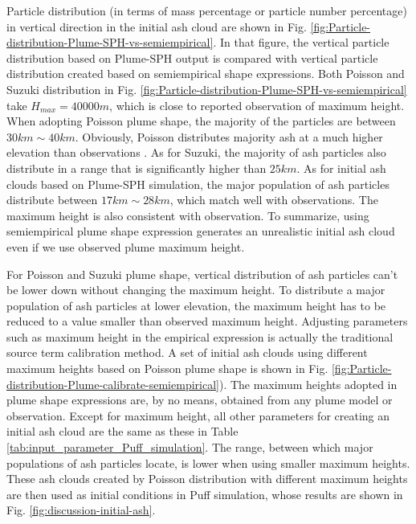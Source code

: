 \documentclass[utf8]{frontiersSCNS} %
\begin{document}
Particle distribution (in terms of mass percentage or particle number percentage) in vertical direction in the initial ash cloud are shown in Fig. \ref{fig:Particle-distribution-Plume-SPH-vs-semiempirical}. In that figure, the vertical particle distribution based on Plume-SPH output is compared with vertical particle distribution created based on semiempirical shape expressions. Both Poisson and Suzuki distribution in Fig. \ref{fig:Particle-distribution-Plume-SPH-vs-semiempirical} take $H_{max} = 40000m$, which is close to reported observation of maximum height. When adopting Poisson plume shape, the majority of the particles are between $30 km \sim 40 km$. Obviously, Poisson distributes majority ash at a much higher elevation than observations \citep[e.g.][]{fero2008simulation}. As for Suzuki, the majority of ash particles also distribute in a range that is significantly higher than $25 km$. As for initial ash clouds based on Plume-SPH simulation, the major population of ash particles distribute between $17 km \sim 28 km$, which match well with observations. The maximum height is also consistent with observation. To summarize, using semiempirical plume shape expression generates an unrealistic initial ash cloud even if we use observed plume maximum height.

For Poisson and Suzuki plume shape, vertical distribution of ash particles can't be lower down without changing the maximum height. To distribute a major population of ash particles at lower elevation, the maximum height has to be reduced to a value smaller than observed maximum height. Adjusting parameters such as maximum height in the empirical expression is actually the traditional source term calibration method. A set of initial ash clouds using different maximum heights based on Poisson plume shape is shown in Fig. \ref{fig:Particle-distribution-Plume-calibrate-semiempirical}). The maximum heights adopted in plume shape expressions are, by no means, obtained from any plume model or observation. Except for maximum height, all other parameters for creating an initial ash cloud are the same as these in Table \ref{tab:input_parameter_Puff_simulation}. The range, between which major populations of ash particles locate, is lower when using smaller maximum heights. These ash clouds created by Poisson distribution with different maximum heights are then used as initial conditions in Puff simulation, whose results are shown in Fig. \ref{fig:discussion-initial-ash}.
\end{document}
